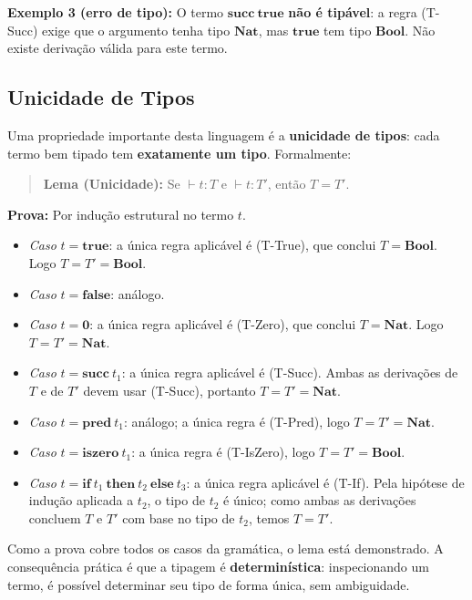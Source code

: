 \textbf{Exemplo 3 (erro de tipo):} O termo
\(\mathbf{succ}\ \mathbf{true}\) \textbf{não é tipável}: a regra
(T-Succ) exige que o argumento tenha tipo \(\mathbf{Nat}\), mas
\(\mathbf{true}\) tem tipo \(\mathbf{Bool}\). Não existe derivação
válida para este termo.

\subsection{Unicidade de Tipos}

Uma propriedade importante desta linguagem é a \textbf{unicidade de
tipos}: cada termo bem tipado tem \textbf{exatamente um tipo}. Formalmente:

\begin{quote}
  \textbf{Lema (Unicidade):} Se \(\vdash t : T\) e \(\vdash t : T'\),
  então \(T = T'\).
\end{quote}

\textbf{Prova:} Por indução estrutural no termo \(t\).

\begin{itemize}
  \item
    \emph{Caso} \(t = \mathbf{true}\): a única regra aplicável é
    (T-True), que conclui \(T = \mathbf{Bool}\). Logo \(T = T' =
    \mathbf{Bool}\).
  \item
    \emph{Caso} \(t = \mathbf{false}\): análogo.
  \item
    \emph{Caso} \(t = \mathbf{0}\): a única regra aplicável é
    (T-Zero), que conclui \(T = \mathbf{Nat}\). Logo \(T = T' = \mathbf{Nat}\).
  \item
    \emph{Caso} \(t = \mathbf{succ}\ t_1\): a única regra aplicável é
    (T-Succ). Ambas as derivações de \(T\) e de \(T'\) devem usar
    (T-Succ), portanto \(T = T' = \mathbf{Nat}\).
  \item
    \emph{Caso} \(t = \mathbf{pred}\ t_1\): análogo; a única regra
    é (T-Pred), logo \(T = T' = \mathbf{Nat}\).
  \item
    \emph{Caso} \(t = \mathbf{iszero}\ t_1\): a única regra é
    (T-IsZero), logo \(T = T' = \mathbf{Bool}\).
  \item
    \emph{Caso} \(t =
    \mathbf{if}\ t_1\ \mathbf{then}\ t_2\ \mathbf{else}\ t_3\): a
    única regra aplicável é (T-If). Pela hipótese de indução aplicada
    a \(t_2\), o tipo de \(t_2\) é único; como ambas as derivações
    concluem \(T\) e \(T'\) com base no tipo de \(t_2\), temos \(T = T'\).
\end{itemize}

Como a prova cobre todos os casos da gramática, o lema está
demonstrado. A consequência prática é que a tipagem é
\textbf{determinística}: inspecionando um termo, é possível
determinar seu tipo de forma única, sem ambiguidade.

